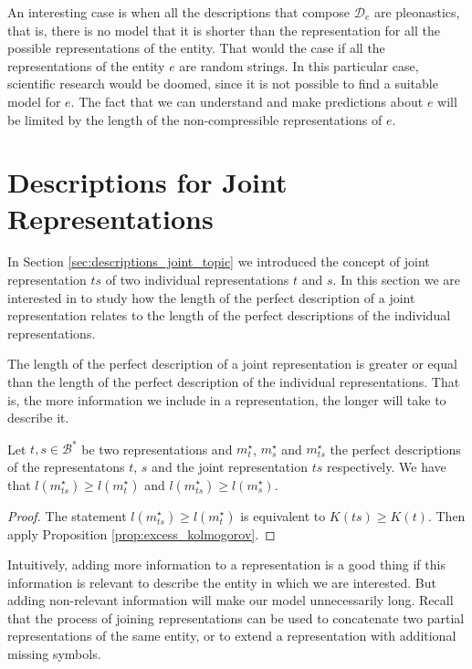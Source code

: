 An interesting case is when all the descriptions that compose $\mathcal{D}_e$ are pleonastics, that is, there is no model that it is shorter than the representation for all the possible representations of the entity. That would the case if all the representations of the entity $e$ are random strings. In this particular case, scientific research would be doomed, since it is not possible to find a suitable model for $e$. The fact that we can understand and make predictions about $e$ will be limited by the length of the non-compressible representations of $e$.


%
%

\section{Descriptions for Joint Representations}
\label{sec:description_joint_represenation}

In Section \ref{sec:descriptions_joint_topic} we introduced the concept of joint representation $ts$ of two individual representations $t$ and $s$. In this section we are interested in to study how the length of the perfect description of a joint representation relates to the length of the perfect descriptions of the individual representations.

The length of the perfect description of a joint representation is greater or equal than the length of the perfect description of the individual representations. That is, the more information we include in a representation, the longer will take to describe it. 

\begin{proposition}
\label{prop:joint_length}
Let $t,s \in \mathcal{B}^\ast$ be two representations and $m_{t}^{\star}$, $m_{s}^{\star}$ and $m_{ts}^{\star}$ the perfect descriptions of the representatons $t$, $s$ and the joint representation $ts$ respectively. We have that $l \left( m_{ts}^{\star} \right) \geq l \left( m_{t}^{\star} \right)$ and $l \left( m_{ts}^{\star} \right) \geq l \left( m_{s}^{\star} \right)$.
\end{proposition}
\begin{proof}
The statement $l \left( m_{ts}^{\star} \right) \geq l \left( m_{t}^{\star} \right)$ is equivalent to $K(ts) \geq K(t)$. Then apply Proposition \ref{prop:excess_kolmogorov}.
\end{proof}

Intuitively, adding more information to a representation is a good thing if this information is relevant to describe the entity in which we are interested. But adding non-relevant information will make our model unnecessarily long. Recall that the process of joining representations can be used to concatenate two partial representations of the same entity, or to extend a representation with additional missing symbols.

